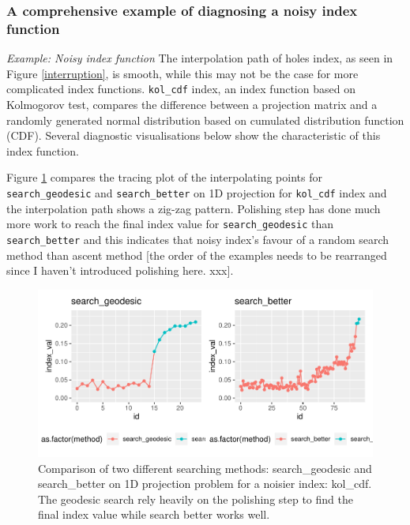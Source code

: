 \documentclass[12pt]{article}
\begin{document}
\hypertarget{a-comprehensive-example-of-diagnosing-a-noisy-index-function}{%
\subsubsection{A comprehensive example of diagnosing a noisy index
function}\label{a-comprehensive-example-of-diagnosing-a-noisy-index-function}}

\emph{Example: Noisy index function} The interpolation path of holes
index, as seen in Figure \ref{interruption}, is smooth, while this may
not be the case for more complicated index functions. \texttt{kol\_cdf}
index, an index function based on Kolmogorov test, compares the
difference between a projection matrix and a randomly generated normal
distribution based on cumulated distribution function (CDF). Several
diagnostic visualisations below show the characteristic of this index
function.

Figure \ref{kol-cdf} compares the tracing plot of the interpolating
points for \texttt{search\_geodesic} and \texttt{search\_better} on 1D
projection for \texttt{kol\_cdf} index and the interpolation path shows
a zig-zag pattern. Polishing step has done much more work to reach the
final index value for \texttt{search\_geodesic} than
\texttt{search\_better} and this indicates that noisy index's favour of
a random search method than ascent method {[}the order of the examples
needs to be rearranged since I haven't introduced polishing here.
xxx{]}.

\begin{figure}
\centering
\includegraphics{paper_files/figure-latex/kol-cdf-1.pdf}
\caption{\label{kol-cdf}Comparison of two different searching methods:
search\_geodesic and search\_better on 1D projection problem for a
noisier index: kol\_cdf. The geodesic search rely heavily on the
polishing step to find the final index value while search better works
well.}
\end{figure}
\end{document}
